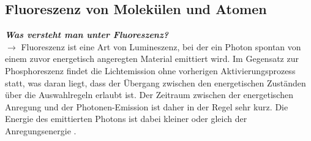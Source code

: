 \subsection{\label{subsec:FZV1}Fluoreszenz von Molekülen und Atomen}
\textbf{\textit{Was versteht man unter Fluoreszenz?}} \\
$\rightarrow$
Fluoreszenz ist eine Art von Lumineszenz, bei der ein Photon spontan von einem zuvor 
energetisch angeregten Material emittiert wird. 
Im Gegensatz zur Phosphoreszenz findet die Lichtemission ohne vorherigen 
Aktivierungsprozess statt, was daran liegt, dass der Übergang zwischen den 
energetischen Zuständen über die Auswahlregeln erlaubt ist.
Der Zeitraum zwischen der energetischen Anregung und der Photonen-Emission 
ist daher in der Regel sehr kurz. 
Die Energie des emittierten Photons ist dabei kleiner oder gleich der 
Anregungsenergie \cite{EPC, AMO, Demtroder, Prinzip}. \\


